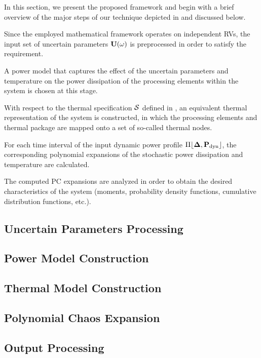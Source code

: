 In this section, we present the proposed framework and begin with a brief overview of the major steps of our technique depicted in  and discussed below.

 Since the employed mathematical framework operates on independent RVs, the input set of uncertain parameters $\mathbf{U}(\omega)$ is preprocessed in order to satisfy the requirement.

 A power model that captures the effect of the uncertain parameters and temperature on the power dissipation of the processing elements within the system is chosen at this stage.

 With respect to the thermal specification $\mathcal{S}$ defined in , an equivalent thermal representation of the system is constructed, in which the processing elements and thermal package are mapped onto a set of so-called thermal nodes.

 For each time interval of the input dynamic power profile $\profPdyn$, the corresponding polynomial expansions of the stochastic power dissipation and temperature are calculated.

 The computed PC expansions are analyzed in order to obtain the desired characteristics of the system (moments, probability density functions, cumulative distribution functions, etc.).

\subsection{Uncertain Parameters Processing} 


\subsection{Power Model Construction} 


\subsection{Thermal Model Construction} 


\subsection{Polynomial Chaos Expansion} 


\subsection{Output Processing} 

